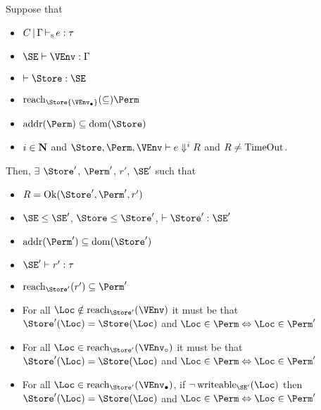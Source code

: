 \begin{theorem}
  Suppose that
  \begin{itemize}
  \item $C \operatorname{|} \Gamma \operatorname{\vdash_s} e : \tau$
  \item $\SE \vdash \VEnv : \E$
  \item $\vdash \Store : \SE$
  \item $\Reach\Store{\Active\VEnv} \subseteq \Perm$
  \item $\Addresses\Perm \subseteq \Dom\Store$
  \item  $i\in\mathbf{N}$ and $\Store, \Perm, \VEnv \vdash {e}
    \Downarrow^i R$ and $R\ne \operatorname{TimeOut}$.
  \end{itemize}
  Then,
  $\exists$ $\Store'$, $\Perm'$, $r'$, $\SE'$ such that
  \begin{itemize}
  \item
    $R = \Ok{\Store', \Perm', r'}$  
  \item $\SE \le \SE'$, $\Store \le \Store'$,
    $\vdash \Store' : \SE'$ 
  \item $\Addresses{\Perm'} \subseteq \Dom{\Store'}$
  \item $\SE' \vdash r' : \tau$
  \item $\Reach{\Store'}{r'} \subseteq \Perm'$
  \item For all $\Loc \notin \Reach{\Store'}{\VEnv}$ it must be that
    $\Store' (\Loc) = \Store (\Loc)$
    and $\Loc\in\Perm \Leftrightarrow \Loc\in\Perm'$ 
  \item For all $\Loc \in \Reach{\Store'}{\ImmutableBorrows\VEnv}$ it must be that
    $\Store' (\Loc) = \Store (\Loc)$
    and $\Loc\in\Perm \Leftrightarrow \Loc\in\Perm'$ 
  \item For all $\Loc \in \Reach{\Store'}{\Active\VEnv}$,
    if $\neg \Writeable{\SE'}\Loc $ then
    $\Store' (\Loc) = \Store (\Loc)$
    and $\Loc\in\Perm \Leftrightarrow \Loc\in\Perm'$ 
  \end{itemize}
\end{theorem}
    
